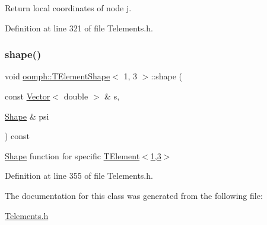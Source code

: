 Return local coordinates of node j. 



Definition at line 321 of file Telements.\+h.

\mbox{\label{classoomph_1_1TElementShape_3_011_00_013_01_4_adf2d6ccfcceccd657650bb25d685b00c}} 
\subsubsection{\texorpdfstring{shape()}{shape()}}
{\footnotesize\ttfamily void \hyperlink{classoomph_1_1TElementShape}{oomph\+::\+T\+Element\+Shape}$<$ 1, 3 $>$\+::shape (\begin{DoxyParamCaption}\item[{const \hyperlink{classoomph_1_1Vector}{Vector}$<$ double $>$ \&}]{s,  }\item[{\hyperlink{classoomph_1_1Shape}{Shape} \&}]{psi }\end{DoxyParamCaption}) const\hspace{0.3cm}{\ttfamily [inline]}}



\hyperlink{classoomph_1_1Shape}{Shape} function for specific \hyperlink{classoomph_1_1TElement}{T\+Element$<$1,3$>$} 



Definition at line 355 of file Telements.\+h.



The documentation for this class was generated from the following file\+:\begin{DoxyCompactItemize}
\item 
\hyperlink{Telements_8h}{Telements.\+h}\end{DoxyCompactItemize}
